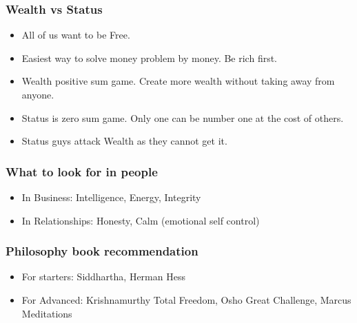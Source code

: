 \begin{frame}[fragile]\frametitle{Wealth vs Status}

\begin{itemize}
\item All of us want to be Free.
\item Easiest way to solve money problem by money. Be rich first.
\item Wealth positive sum game. Create more wealth without taking away from anyone.
\item Status is zero sum game. Only one can be number one at the cost of others.
\item Status guys attack Wealth as they cannot get it.
\end{itemize}

\end{frame}

\begin{frame}[fragile]\frametitle{What to look for in people}

\begin{itemize}
\item In Business: Intelligence, Energy, Integrity
\item In Relationships: Honesty, Calm (emotional self control)
\end{itemize}

\end{frame}

\begin{frame}[fragile]\frametitle{Philosophy book recommendation}

\begin{itemize}
\item For starters: Siddhartha, Herman Hess
\item For Advanced: Krishnamurthy Total Freedom, Osho Great Challenge, Marcus Meditations
\end{itemize}

\end{frame}

